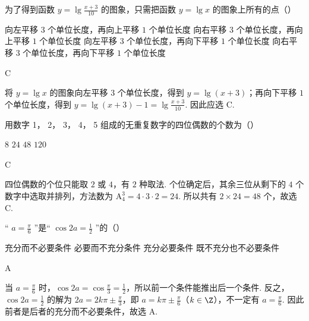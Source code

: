 \begin{problem}
为了得到函数 \( y = \lg \frac{x + 3}{10} \) 的图象，只需把函数 \( y = \lg x \) 的图象上所有的点（\quad）

\choices
    {向左平移 \(3\) 个单位长度，再向上平移 \(1\) 个单位长度}
    {向右平移 \(3\) 个单位长度，再向上平移 \(1\) 个单位长度}
    {向左平移 \(3\) 个单位长度，再向下平移 \(1\) 个单位长度}
    {向右平移 \(3\) 个单位长度，再向下平移 \(1\) 个单位长度}
\begin{answer}
C
\end{answer}

\begin{solution}
将 \(y=\lg x\) 的图象向左平移 \(3\) 个单位长度，得到 \(y=\lg(x+3)\)；再向下平移 \(1\) 个单位长度，得到 \(y=\lg(x+3)-1=\lg\frac{x+3}{10}\). 因此应选 C.
\end{solution}
\end{problem}

\begin{problem}
用数字 1， 2， 3， 4， 5 组成的无重复数字的四位偶数的个数为（\quad）

\choices
    {\(8\)}
    {\(24\)}
    {\(48\)}
    {\(120\)}
\begin{answer}
C
\end{answer}

\begin{solution}
四位偶数的个位只能取 \(2\) 或 \(4\)，有 \(2\) 种取法. 个位确定后，其余三位从剩下的 \(4\) 个数字中选取并排列，方法数为 \(\mathrm A_4^3=4\cdot3\cdot2=24\). 所以共有 \(2\times24=48\) 个，故选 C.
\end{solution}
\end{problem}

\begin{problem}
“ \( a=\frac{\pi}{6} \) ”是“ \( \cos2a=\frac{1}{2} \) ”的（\quad）

\choices
    {充分而不必要条件}
    {必要而不充分条件}
    {充分必要条件}
    {既不充分也不必要条件}
\begin{answer}
A
\end{answer}

\begin{solution}
当 \(a=\frac{\pi}{6}\) 时，\(\cos2a=\cos\frac{\pi}{3}=\frac{1}{2}\)，所以前一个条件能推出后一个条件. 反之，\(\cos2a=\frac{1}{2}\) 的解为 \(2a=2k\pi\pm\frac{\pi}{3}\)，即 \(a=k\pi\pm\frac{\pi}{6}\)（\(k\in\Z\)），不一定有 \(a=\frac{\pi}{6}\). 因此前者是后者的充分而不必要条件，故选 A.
\end{solution}
\end{problem}

